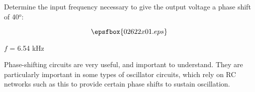 

Determine the input frequency necessary to give the output voltage a phase shift of 40$^{o}$:

$$\epsfbox{02622x01.eps}$$







$f$ = 6.54 kHz







Phase-shifting circuits are very useful, and important to understand.  They are particularly important in some types of oscillator circuits, which rely on RC networks such as this to provide certain phase shifts to sustain oscillation.




